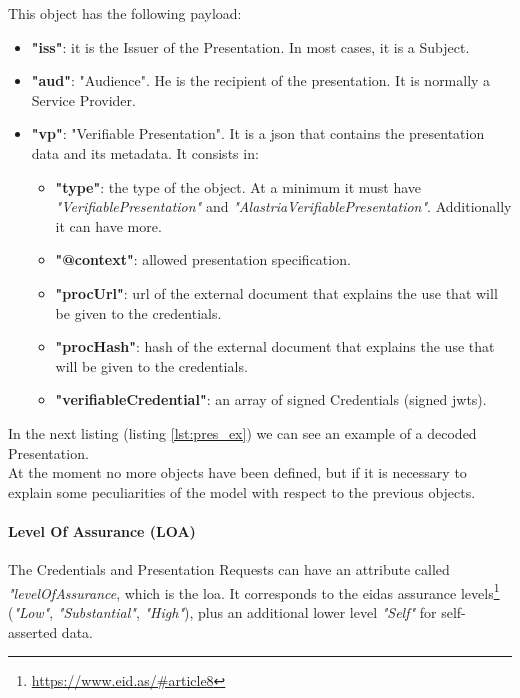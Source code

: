 This object has the following payload:
\begin{itemize}
    \item \textbf{"iss"}: it is the Issuer of the Presentation. In most cases, it is a Subject.
    \item \textbf{"aud"}: "Audience". He is the recipient of the presentation. It is normally a Service Provider.
    \item \textbf{"vp"}: "Verifiable Presentation". It is a \acrshort{json} that contains the presentation data and its metadata. It consists in:
          \begin{itemize}
              \item \textbf{"type"}: the type of the object. At a minimum it must have \textit{"VerifiablePresentation"} and \textit{"AlastriaVerifiablePresentation"}. Additionally it can have more.
              \item \textbf{"@context"}: allowed presentation specification.
              \item \textbf{"procUrl"}: \acrshort{url} of the external document that explains the use that will be given to the credentials.
              \item \textbf{"procHash"}: hash of the external document that explains the use that will be given to the credentials.
              \item \textbf{"verifiableCredential"}: an array of signed Credentials (signed \acrshort{jwt}s).
          \end{itemize}
\end{itemize}
In the next listing (listing \ref{lst:pres_ex}) we can see an example of a decoded Presentation.\\


At the moment no more objects have been defined, but if it is necessary to explain some peculiarities of the model with respect to the previous objects.

\paragraph{Level Of Assurance (LOA)}
The Credentials and Presentation Requests can have an attribute called \textit{"levelOfAssurance}, which is the \acrfull{loa}. It corresponds to the \acrshort{eidas} assurance levels\footnote{\url{https://www.eid.as/\#article8}} (\textit{"Low"}, \textit{"Substantial"}, \textit{"High"}), plus an additional lower level \textit{"Self"} for self-asserted data. \\

